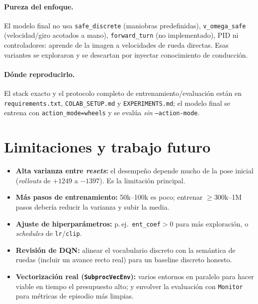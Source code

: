 \documentclass[11pt,a4paper]{article}
\newcommand{\code}[1]{\texttt{#1}}
\begin{document}
\paragraph{Pureza del enfoque.} El modelo final no usa \code{safe\_discrete} (maniobras
predefinidas), \code{v\_omega\_safe} (velocidad/giro acotados a mano), \code{forward\_turn}
(no implementado), PID ni controladores: aprende de la imagen a velocidades de rueda directas.
Esas variantes se exploraron y se descartan por inyectar conocimiento de conducción.

\paragraph{Dónde reproducirlo.} El stack exacto y el protocolo completo de
entrenamiento/evaluación están en \code{requirements.txt}, \code{COLAB\_SETUP.md} y
\code{EXPERIMENTS.md}; el modelo final se entrena con \code{action\_mode=wheels} y se
evalúa \emph{sin} \code{--action-mode}.

\section{Limitaciones y trabajo futuro}
\begin{itemize}
  \item \textbf{Alta varianza entre \emph{resets}:} el desempeño depende mucho de la pose
  inicial (\emph{rollouts} de $+1249$ a $-1397$). Es la limitación principal.
  \item \textbf{Más pasos de entrenamiento:} 50k--100k es poco; entrenar $\geq$300k--1M
  pasos debería reducir la varianza y subir la media.
  \item \textbf{Ajuste de hiperparámetros:} p.\,ej.\ \code{ent\_coef}$>0$ para más
  exploración, o \emph{schedules} de \code{lr}/\code{clip}.
  \item \textbf{Revisión de DQN:} alinear el vocabulario discreto con la semántica de ruedas
  (incluir un avance recto real) para un baseline discreto honesto.
  \item \textbf{Vectorización real (\code{SubprocVecEnv}):} varios entornos en paralelo para
  hacer viable en tiempo el presupuesto alto; y envolver la evaluación con \code{Monitor}
  para métricas de episodio más limpias.
\end{itemize}
\end{document}
